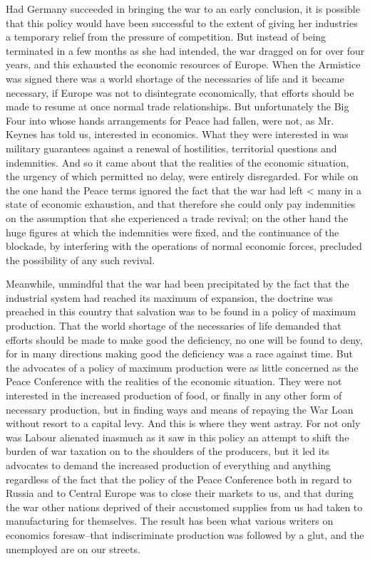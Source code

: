 \documentclass{book}
\begin{document}
Had Germany succeeded in bringing the war to an early conclusion, it is possible that this policy would have been successful to the extent of giving her industries a temporary relief from the pressure of competition. But instead of being terminated in a few months as she had intended, the war dragged on for over four years, and this exhausted the economic resources of Europe. When the Armistice was signed there was a world shortage of the necessaries of life and it became necessary, if Europe was not to disintegrate economically, that efforts should be made to resume at once normal trade relationships. But unfortunately the Big Four into whose hands arrangements for Peace had fallen, were not, as Mr. Keynes has told us, interested in economics. What they were interested in was military guarantees against a renewal of hostilities, territorial questions and indemnities. And so it came about that the realities of the economic situation, the urgency of which permitted no delay, were entirely disregarded. For while on the one hand the Peace terms ignored the fact that the war had left < many in a state of economic exhaustion, and that therefore she could only pay indemnities on the assumption that she experienced a trade revival; on the other hand the huge figures at which the indemnities were fixed, and the continuance of the blockade, by interfering with the operations of normal economic forces, precluded the possibility of any such revival.

Meanwhile, unmindful that the war had been precipitated by the fact that the industrial system had reached its maximum of expansion, the doctrine was preached in this country that salvation was to be found in a policy of maximum production. That the world shortage of the necessaries of life demanded that efforts should be made to make good the deficiency, no one will be found to deny, for in many directions making good the deficiency was a race against time. But the advocates of a policy of maximum production were as little concerned as the Peace Conference with the realities of the economic situation. They were not interested in the increased production of food, or finally in any other form of necessary production, but in finding ways and means of repaying the War Loan without resort to a capital levy. And this is where they went astray. For not only was Labour alienated inasmuch as it saw in this policy an attempt to shift the burden of war taxation on to the shoulders of the producers, but it led its advocates to demand the increased production of everything and anything regardless of the fact that the policy of the Peace Conference both in regard to Russia and to Central Europe was to close their markets to us, and that during the war other nations deprived of their accustomed supplies from us had taken to manufacturing for themselves. The result has been what various writers on economics foresaw–that indiscriminate production was followed by a glut, and the unemployed are on our streets.
\end{document}
